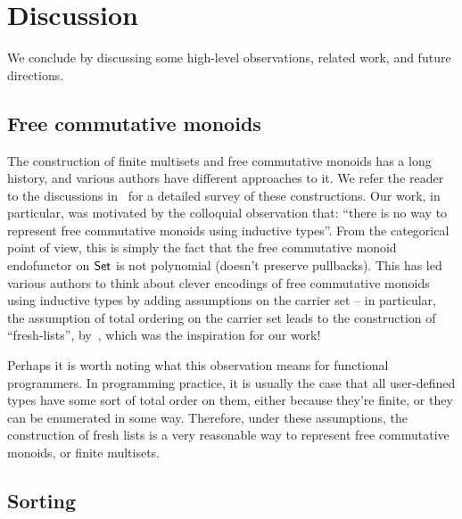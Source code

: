 \section{Discussion}
\label{sec:discussion}

We conclude by discussing some high-level observations, related work, and future directions.

\subsection*{Free commutative monoids}

The construction of finite multisets and free commutative monoids has a long history, and various authors have different
approaches to it. We refer the reader to the discussions
in~\cite*{choudhuryFreeCommutativeMonoids2023,joramConstructiveFinalSemantics2023} for a detailed survey of these
constructions.
%
Our work, in particular, was motivated by the colloquial observation that:
``there is no way to represent free commutative monoids using inductive types''.
%
From the categorical point of view, this is simply the fact that the free commutative monoid endofunctor on $\mathsf{Set}$ is
not polynomial (doesn't preserve pullbacks).
%
This has led various authors to think about clever encodings of free commutative monoids using inductive types by adding
assumptions on the carrier set -- in particular, the assumption of total ordering on the carrier set leads to the
construction of ``fresh-lists'', by~\cite{kupkeFreshLookCommutativity2023}, which was the inspiration for our work!

Perhaps it is worth noting what this observation means for functional programmers.
%
In programming practice, it is usually the case that all user-defined types have some sort of total order on them,
either because they're finite, or they can be enumerated in some way.
%
Therefore, under these assumptions, the construction of fresh lists is a very reasonable way to represent free
commutative monoids, or finite multisets.

\subsection*{Sorting}

